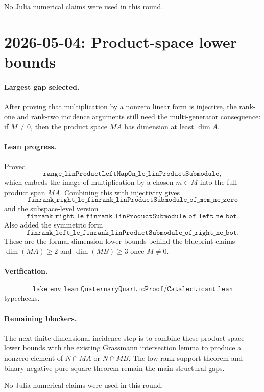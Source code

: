 \documentclass[11pt]{article}
\begin{document}
No Julia numerical claims were used in this round.

\section*{2026-05-04: Product-space lower bounds}

\paragraph{Largest gap selected.}
After proving that multiplication by a nonzero linear form is injective, the
rank-one and rank-two incidence arguments still need the multi-generator
consequence: if \(M\neq0\), then the product space \(MA\) has dimension at
least \(\dim A\).

\paragraph{Lean progress.}
Proved
\[
\texttt{range\_linProductLeftMapOn\_le\_linProductSubmodule},
\]
which embeds the image of multiplication by a chosen \(m\in M\) into the full
product span \(MA\).  Combining this with injectivity gives
\[
\texttt{finrank\_right\_le\_finrank\_linProductSubmodule\_of\_mem\_ne\_zero}
\]
and the subspace-level version
\[
\texttt{finrank\_right\_le\_finrank\_linProductSubmodule\_of\_left\_ne\_bot}.
\]
Also added the symmetric form
\[
\texttt{finrank\_left\_le\_finrank\_linProductSubmodule\_of\_right\_ne\_bot}.
\]
These are the formal dimension lower bounds behind the blueprint claims
\(\dim(MA)\ge2\) and \(\dim(MB)\ge3\) once \(M\neq0\).

\paragraph{Verification.}
\[
\texttt{lake env lean QuaternaryQuarticProof/Catalecticant.lean}
\]
typechecks.

\paragraph{Remaining blockers.}
The next finite-dimensional incidence step is to combine these product-space
lower bounds with the existing Grassmann intersection lemma to produce a
nonzero element of \(N\cap MA\) or \(N\cap MB\).  The low-rank support theorem
and binary negative-pure-square theorem remain the main structural gaps.

No Julia numerical claims were used in this round.
\end{document}
